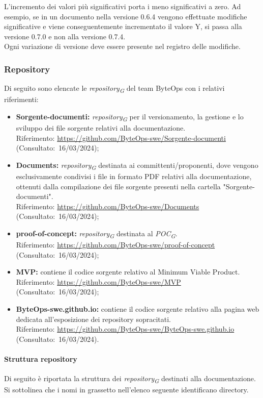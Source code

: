 L'incremento dei valori più significativi porta i meno significativi a zero. Ad esempio, se in un documento nella versione 0.6.4 vengono effettuate modifiche significative e viene conseguentemente incrementato il valore Y, si passa alla versione 0.7.0 e non alla versione 0.7.4. \\
Ogni variazione di versione deve essere presente nel registro delle modifiche.

\subsubsection{Repository}
Di seguito sono elencate le \textit{repository}\textsubscript{\textit{G}} del team ByteOps con i relativi riferimenti:
\begin{itemize}
    \item \textbf{Sorgente-documenti:} \textit{repository}\textsubscript{\textit{G}} per il versionamento, la gestione e lo sviluppo dei file sorgente relativi alla documentazione. \\
    Riferimento: \url{https://github.com/ByteOps-swe/Sorgente-documenti} (Consultato:~16/03/2024);
    \item \textbf{Documents:} \textit{repository}\textsubscript{\textit{G}} destinata ai committenti/proponenti, dove vengono esclusivamente condivisi i file in formato PDF relativi alla documentazione, ottenuti dalla compilazione dei file sorgente presenti nella cartella "Sorgente-documenti". \\
    Riferimento: \url{https://github.com/ByteOps-swe/Documents} (Consultato:~16/03/2024);
    \item \textbf{proof-of-concept:} \textit{repository}\textsubscript{\textit{G}} destinata al \textit{POC}\textsubscript{\textit{G}}. \\
    Riferimento: \url{https://github.com/ByteOps-swe/proof-of-concept} (Consultato:~16/03/2024);
    \item \textbf{MVP:} contiene il codice sorgente relativo al Minimum Viable Product. \\
    Riferimento: \url{https://github.com/ByteOps-swe/MVP} (Consultato:~16/03/2024);
    \item \textbf{ByteOps-swe.github.io:} contiene il codice sorgente relativo alla pagina web dedicata all'esposizione dei repository sopracitati. \\
    Riferimento: \url{https://github.com/ByteOps-swe/ByteOps-swe.github.io} (Consultato:~16/03/2024).
\end{itemize}
\paragraph{Struttura repository}
Di seguito è riportata la struttura dei \textit{repository}\textsubscript{\textit{G}} destinati alla documentazione. Si sottolinea che i nomi in grassetto nell'elenco seguente identificano directory.

